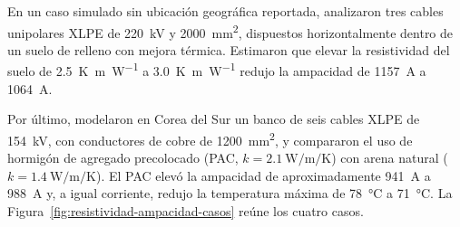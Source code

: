 En un caso simulado sin ubicación geográfica reportada, \textcite[15--16]{atoccsa2024} analizaron tres cables unipolares XLPE de \SI{220}{\kilo\volt} y \SI{2000}{\milli\metre\squared}, dispuestos horizontalmente dentro de un suelo de relleno con mejora térmica. Estimaron que elevar la resistividad del suelo de \SI{2.5}{\kelvin\metre\per\watt} a \SI{3.0}{\kelvin\metre\per\watt} redujo la ampacidad de \SI{1157}{\ampere} a \SI{1064}{\ampere}.

Por último, \textcite[12--16]{kim2025} modelaron en Corea del Sur un banco de seis cables XLPE de \SI{154}{\kilo\volt}, con conductores de cobre de \SI{1200}{\milli\metre\squared}, y compararon el uso de hormigón de agregado precolocado (PAC, $k=\SI{2.1}{\watt\per\metre\per\kelvin}$) con arena natural ($k=\SI{1.4}{\watt\per\metre\per\kelvin}$). El PAC elevó la ampacidad de aproximadamente \SI{941}{\ampere} a \SI{988}{\ampere} y, a igual corriente, redujo la temperatura máxima de \SI{78}{\celsius} a \SI{71}{\celsius}. La Figura~\ref{fig:resistividad-ampacidad-casos} reúne los cuatro casos.

